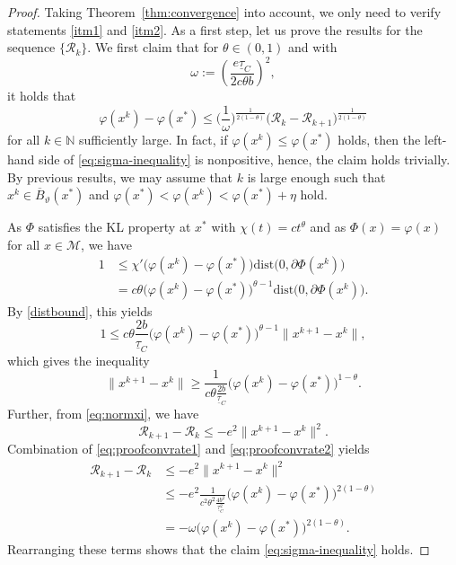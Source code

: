 \documentclass[10pt,a4paper]{amsart}
\newcommand{\Rvalue}{\mathcal{R}}
\newcommand{\clball}{\overline{B}}
\newcommand{\dist}{\mathrm{dist}}
\newcommand{\taug}{\underline{\tau}}
\newcommand{\xk}{x^k}
\newcommand{\xkp}{x^{k+1}}
\begin{document}
\begin{proof}
Taking Theorem~\ref{thm:convergence} into account, we only need to verify statements \ref{itm1} and \ref{itm2}. As a first step, let us prove the results for the sequence $\{\Rvalue_k\}$. We first claim that for $\theta \in (0,1)$ and with
\begin{equation*}
	\omega := \left(\frac{e \taug_C}{2 c \theta b}\right)^2,
\end{equation*}
it holds that
\begin{equation}\label{eq:sigma-inequality}
	\varphi(\xk) - \varphi(x^*) \leq \Big(\frac{1}{\omega}\Big)^{\frac{1}{2(1-\theta)}} \big( \Rvalue_k - \Rvalue_{k+1} \big)^{\frac{1}{2(1-\theta)}}
\end{equation}
for all $k \in \mathbb{N}$ sufficiently large. In fact, if $\varphi(\xk) \leq \varphi(x^*)$ holds, then the left-hand side of \eqref{eq:sigma-inequality}
is nonpositive, hence, the claim holds trivially.
By previous results, we may assume that $k$ is large enough such 
that $\xk \in \clball_\vartheta (x^*)$ and $\varphi(x^*) < \varphi(\xk) < \varphi(x^*) + \eta$ hold.

As $\Phi$ satisfies the KL property at $x^*$ with $\chi(t) = ct^{\theta}$ and as $\Phi(x) = \varphi(x)$ for all $x \in \mathcal{M}$, we have
\begin{align*}
	1 & \leq \chi' \big( \varphi(\xk) - \varphi(x^*) \big)
	\dist \big( 0, \partial \Phi(\xk) \big)\\
	& = c\theta \big( \varphi(\xk) - \varphi(x^*) \big)^{\theta -1}
    \dist \big( 0, \partial \Phi (\xk) \big).
\end{align*}
By \eqref{distbound}, this yields
\begin{equation*}
	1 \leq c\theta \frac{2 b}{\taug_C}  \big( \varphi(\xk) - \varphi(x^*) \big)^{\theta -1} \| \xkp - x^k \|,
\end{equation*}
which gives the inequality
\begin{equation}\label{eq:proofconvrate1}
	\|\xkp - x^k \| \geq \frac{1}{c \theta \frac{2 b}{\taug_C}}
	\big( \varphi(\xk) - \varphi(x^*) \big)^{1-\theta}.
\end{equation}
Further, from \eqref{eq:normxi}, we have
\begin{equation}\label{eq:proofconvrate2}
	\Rvalue_{k+1} - \Rvalue_k \leq - e^2 \|\xkp - \xk \|^2 .
\end{equation}
Combination of \eqref{eq:proofconvrate1} and 
\eqref{eq:proofconvrate2} yields
\begin{align*}
	\Rvalue_{k+1} - \Rvalue_k &\leq - e^2 \|\xkp - x^k \|^2\\
	 & \leq - e^2 \frac{1}{c^2 \theta^2 \frac{4 b^2}{\taug_C^2}} 
	\big( \varphi(\xk) - \varphi(x^*) \big)^{2(1-\theta)}\\
	& = -\omega \big( \varphi(\xk) - \varphi(x^*) \big)^{2(1-\theta)} .
\end{align*}
Rearranging these terms shows that the claim \eqref{eq:sigma-inequality}
holds.


\end{proof}
\end{document}

